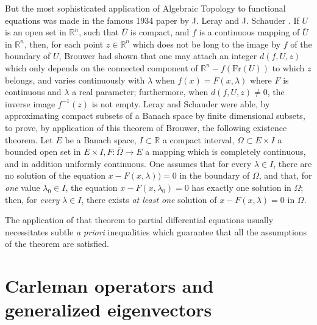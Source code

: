 \documentclass[12pt,a4paper,leqno,twoside]{extbook}
\newcommand{\R}{\mathbb{R}}
\begin{document}
But the most sophisticated application of Algebraic Topology to functional equations was made in the famous 1934 paper by J. Leray and J. Schauder \cite{142}. If \(U\) is an open set in \(\R^n\), such that \(\overline{U}\) is compact, and \(f\) is a continuous mapping of \(\overline{U}\) in \(\R^n\), then, for each point \(z \in \R^n\) which does not be long to the image by \(f\) of the boundary of \(U\), Brouwer had shown that one may attach an integer \(d(f,U,z)\) which only depends on the connected component of \(\R^n - f(\text{Fr}(U))\) to which \(z\) belongs, and varies continuously with \(\lambda\) when \(f(x) = F(x, \lambda)\) where \(F\) is continuous and \(\lambda\) a real parameter; furthermore, when \(d(f,U,z) \neq 0\), the inverse image \(f^{-1}(z)\) is not empty. Leray and Schauder were able, by approximating compact subsets of a Banach space by finite dimensional subsets, to prove, by application of this theorem of Brouwer, the following existence theorem. Let \(E\) be a Banach space, \(I \subset \R\) a compact interval, \(\Omega \subset E \times I\) a bounded open set in \(E \times I, F: \overline{\Omega} \to E\) a mapping which is completely continuous, and in addition uniformly continuous. One assumes that for every \(\lambda \in I\), there are no solution of the equation \(x - F(x, \lambda)) = 0\) in the boundary of \(\Omega\), and that, for \emph{one} value \(\lambda_0 \in I\), the equation \(x - F(x, \lambda_0) = 0\) has exactly one solution in \(\Omega\); then, for \emph{every} \(\lambda \in I\), there exists \emph{at least one} solution of \(x - F(x, \lambda) = 0\) in \(\Omega\).

The application of that theorem to partial differential equations usually necessitates subtle \emph{a priori} inequalities which guarantee that all the assumptions of the theorem are satisfied.

\section{Carleman operators and generalized eigenvectors}
\label{sec:9.2}
\end{document}
